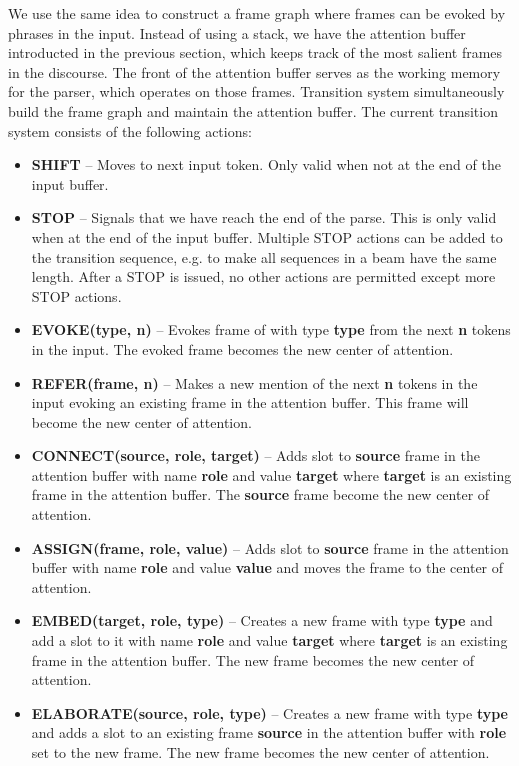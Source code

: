 \documentclass[11pt,a4paper]{article}
\begin{document}
We use the same idea to construct a frame graph where frames can be
evoked by phrases in the input. Instead of using a stack, we have the attention buffer introducted
in the previous section, which keeps track of the most salient frames in the
discourse. The front of the attention buffer serves as the working memory for
the parser, which operates on those frames. Transition system
simultaneously build the frame graph and maintain the
attention buffer. The current transition system consists of the following actions:

\begin{itemize}
  \item {\bf SHIFT} -- Moves to next input token. Only valid when not at the
        end of the input buffer.
  \item {\bf STOP} -- Signals that we have reach the end of the parse. This is
        only valid when at the end of the input buffer. Multiple STOP actions
        can be added to the transition sequence, e.g. to make all sequences in a
        beam have the same length. After a STOP is issued, no other actions are
        permitted except more STOP actions.
  \item {\bf EVOKE(type, n)} -- Evokes frame of with type {\bf type} from
        the next {\bf n} tokens in the input. The evoked frame becomes the new
        center of attention.
  \item {\bf REFER(frame, n)} -- Makes a new mention of the next {\bf n} tokens
        in the input evoking an existing frame in the attention buffer. This
        frame will become the new center of attention.
  \item {\bf CONNECT(source, role, target)} -- Adds slot to {\bf source} frame
        in the attention buffer with name {\bf role} and value {\bf target}
        where {\bf target} is an existing frame in the attention buffer. The
        {\bf source} frame become the new center of attention.
  \item {\bf ASSIGN(frame, role, value)} -- Adds slot to {\bf source} frame in
        the attention buffer  with name {\bf role} and value {\bf value} and
        moves the frame to the center of attention.
  \item {\bf EMBED(target, role, type)} -- Creates a new frame with
        type {\bf type} and add a slot to it with name {\bf role} and value
        {\bf target} where {\bf target} is an existing frame in the attention
        buffer. The new frame becomes the new center of attention.
  \item {\bf ELABORATE(source, role, type)} -- Creates a new frame with type
        {\bf type} and adds a slot to an existing frame {\bf source} in the
        attention buffer with {\bf role} set to the new frame. The new frame
        becomes the new center of attention.
\end{itemize}
\end{document}
